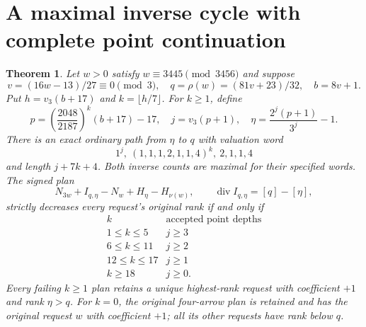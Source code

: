 \documentclass[11pt]{article}
\newtheorem{theorem}{Theorem}
\begin{document}
\section{A maximal inverse cycle with complete point continuation}
\begin{theorem}\label{thm:cycleinverse}
Let $w>0$ satisfy $w\equiv3445\pmod{3456}$ and suppose
\[
 v=(16w-13)/27\equiv0\pmod3,
 \quad q=\rho(w)=(81v+23)/32,\quad b=8v+1.
\]
Put $h=v_3(b+17)$ and $k=\lfloor h/7\rfloor$.
For $k\ge1$, define
\[
 p=\left(\frac{2048}{2187}\right)^k(b+17)-17,
 \quad j=v_3(p+1),\quad \eta=\frac{2^j(p+1)}{3^j}-1.
\]
There is an exact ordinary path from $\eta$ to $q$ with valuation word
\[
 1^j,\ (1,1,1,2,1,1,4)^k,\ 2,1,1,4
\]
and length $j+7k+4$. Both inverse counts are maximal for their
specified words. The signed plan
\[
 N_{3w}+I_{q,\eta}-N_w+H_\eta-H_{\nu(w)},
 \qquad\operatorname{div}I_{q,\eta}=[q]-[\eta],
\]
strictly decreases every request's original rank if and only if
\[
\begin{array}{c|c}
 k&\text{accepted point depths}\\\hline
 1\le k\le5&j\ge3\\
 6\le k\le11&j\ge2\\
 12\le k\le17&j\ge1\\
 k\ge18&j\ge0.
\end{array}
\]
Every failing $k\ge1$ plan retains a unique highest-rank request with
coefficient $+1$ and rank $\eta>q$. For $k=0$, the original four-arrow
plan is retained and has the original request $w$ with coefficient
$+1$; all its other requests have rank below $q$.
\end{theorem}
\end{document}
